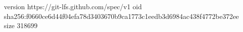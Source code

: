 version https://git-lfs.github.com/spec/v1
oid sha256:f0660ce6d44f04efa78d3403670b9ca1773c1eedb3d6984ac438f4772be372ee
size 318699

